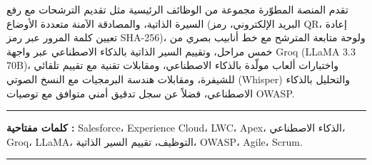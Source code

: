 \medskip

\begin{Arabic}
تقدم المنصة المطوّرة مجموعة من الوظائف الرئيسية مثل تقديم الترشحات مع رفع السيرة الذاتية، والمصادقة الآمنة متعددة الأوضاع (البريد الإلكتروني، رمز QR، إعادة تعيين كلمة المرور عبر رمز SHA-256)، ولوحة متابعة المترشح مع خط أنابيب بصري من خمس مراحل، وتقييم السير الذاتية بالذكاء الاصطناعي عبر واجهة Groq (LLaMA 3.3 70B)، واختبارات ألعاب مولّدة بالذكاء الاصطناعي، ومقابلات تقنية مع تقييم تلقائي للشيفرة، ومقابلات هندسة البرمجيات مع النسخ الصوتي (Whisper) والتحليل بالذكاء الاصطناعي، فضلاً عن سجل تدقيق أمني متوافق مع توصيات OWASP.
\end{Arabic}

\vspace{3cm}

\noindent\rule[2pt]{\textwidth}{0.5pt}

\begin{Arabic}
\textbf{كلمات مفتاحية :}
Salesforce، Experience Cloud، LWC، Apex، الذكاء الاصطناعي، Groq، LLaMA، التوظيف، تقييم السير الذاتية، OWASP، Agile، Scrum.
\end{Arabic}

\noindent\rule[2pt]{\textwidth}{0.5pt}
